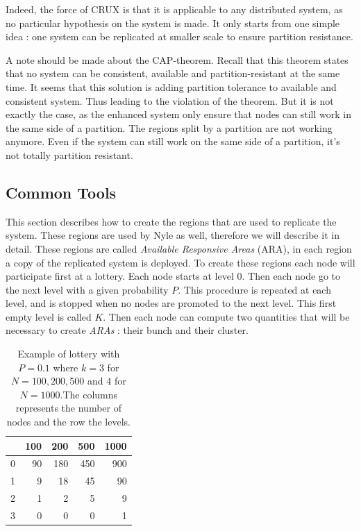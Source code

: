 \documentclass[a4paper,11pt,oneside]{report}
\begin{document}
Indeed, the force of CRUX \cite{Basescu2014} is that it is applicable to any
distributed system, as no particular hypothesis on the system is made. It only
starts from one simple idea : one system can be replicated at smaller scale to
ensure partition resistance. 

A note should be made about the CAP-theorem. Recall that this theorem states
that no system can be consistent, available and partition-resistant at the same
time. It seems that this solution is adding partition tolerance to available
and consistent system. Thus leading to the violation of the theorem. But it is
not exactly the case, as the enhanced system only ensure that nodes can still
work in the same side of a partition. The regions split by a partition are not
working anymore. Even if the system can still work on the same side of a
partition, it's not totally partition resistant.

\subsection{Common Tools} \label{sec:common-tools}
This section describes how to create the
regions that are used to replicate the system. These regions are used by Nyle
as well, therefore we will describe it in detail. These regions are called
\textit{Available Responsive Areas} (ARA), in each region a copy of the replicated
system is deployed. To create these regions each node will participate first at
a lottery. Each node starts at level 0. Then each node go to the next level
with a given probability $P$. This
procedure is repeated at each level, and is stopped when no nodes are promoted
to the next level. This first empty level is called $K$. Then each node can
compute two quantities that will be necessary to create \textit{ARAs} : their
bunch and their cluster. 

\begin{table}[] 
\centering
\begin{tabular}{rrrrr}
& 100 & 200 & 500 & 1000 \\ \hline
\multicolumn{1}{r|}{0} & 90  & 180 & 450 & 900  \\
\multicolumn{1}{r|}{1} & 9 & 18  & 45  & 90   \\
\multicolumn{1}{r|}{2} & 1   & 2   & 5   & 9 \\
\multicolumn{1}{r|}{3} & 0   & 0   & 0   & 1
\end{tabular}
\caption{Example of lottery with $P = 0.1$ where $k= 3$ for $N= 100,200,500$
and $4$ for $N = 1000$.The columns represents the number of nodes and the row the levels. }
\label{example-lottery}
 \end{table}
 
\end{document}
